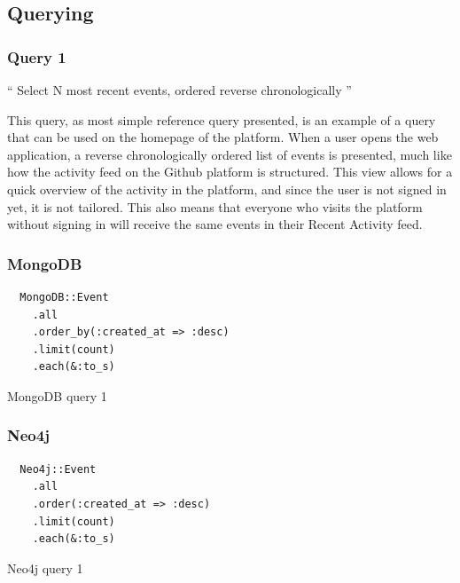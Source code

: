 \subsection{Querying}
\label{subsec:querying}

\subsubsection{Query 1}
\label{subsubsec:query-1}

``
Select N most recent events, ordered reverse chronologically
''

This query, as most simple reference query presented, is an example of a query that can be used on the homepage of the platform.
When a user opens the web application, a reverse chronologically ordered list of events is presented, much like how the activity feed on the Github platform is structured.
This view allows for a quick overview of the activity in the platform, and since the user is not signed in yet, it is not tailored.
This also means that everyone who visits the platform without signing in will receive the same events in their Recent Activity feed.

\subsubsection*{MongoDB}

\begin{listing}[H]
  \begin{verbatim}
  MongoDB::Event
    .all
    .order_by(:created_at => :desc)
    .limit(count)
    .each(&:to_s)
  \end{verbatim}

  \caption{MongoDB query 1}
  \label{lst:mongodb-query-1}
\end{listing}

\subsubsection*{Neo4j}

\begin{listing}[H]
  \begin{verbatim}
  Neo4j::Event
    .all
    .order(:created_at => :desc)
    .limit(count)
    .each(&:to_s)
  \end{verbatim}

  \caption{Neo4j query 1}
  \label{lst:neo4j-query-1}
\end{listing}

